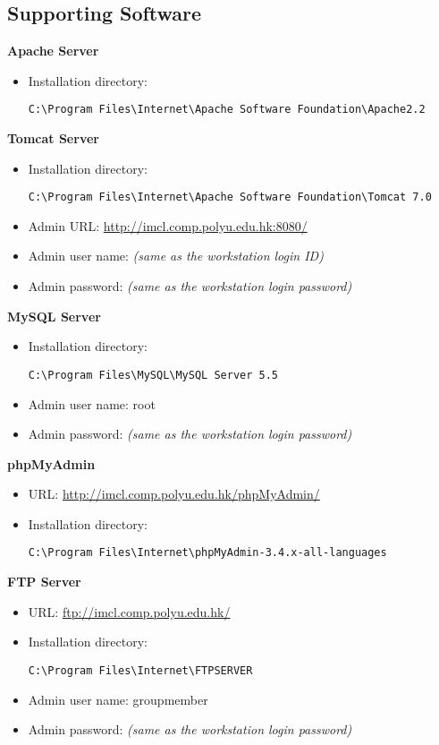 \subsection{Supporting Software}
\textbf{Apache Server}
\begin{itemize}
\item Installation directory: \begin{verbatim}C:\Program Files\Internet\Apache Software Foundation\Apache2.2\end{verbatim}
\end{itemize}
\textbf{Tomcat Server}
\begin{itemize}
\item Installation directory: \begin{verbatim}C:\Program Files\Internet\Apache Software Foundation\Tomcat 7.0\end{verbatim}
\item Admin URL: \url{http://imcl.comp.polyu.edu.hk:8080/}
\item Admin user name: \emph{(same as the workstation login ID)}
\item Admin password: \emph{(same as the workstation login password)}
\end{itemize}
\textbf{MySQL Server}
\begin{itemize}
\item Installation directory: \begin{verbatim}C:\Program Files\MySQL\MySQL Server 5.5\end{verbatim}
\item Admin user name: root
\item Admin password: \emph{(same as the workstation login password)}
\end{itemize}
\textbf{phpMyAdmin}
\begin{itemize}
\item URL: \url{http://imcl.comp.polyu.edu.hk/phpMyAdmin/}
\item Installation directory: \begin{verbatim}C:\Program Files\Internet\phpMyAdmin-3.4.x-all-languages\end{verbatim}
\end{itemize}
\textbf{FTP Server}
\begin{itemize}
\item URL: \url{ftp://imcl.comp.polyu.edu.hk/}
\item Installation directory: \begin{verbatim}C:\Program Files\Internet\FTPSERVER\end{verbatim}
\item Admin user name: groupmember
\item Admin password: \emph{(same as the workstation login password)}
\end{itemize}
